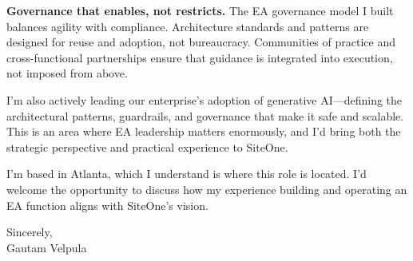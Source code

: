\documentclass[11pt]{article}
\begin{document}
\textbf{Governance that enables, not restricts.} The EA governance model I built balances agility with compliance. Architecture standards and patterns are designed for reuse and adoption, not bureaucracy. Communities of practice and cross-functional partnerships ensure that guidance is integrated into execution, not imposed from above.

I'm also actively leading our enterprise's adoption of generative AI---defining the architectural patterns, guardrails, and governance that make it safe and scalable. This is an area where EA leadership matters enormously, and I'd bring both the strategic perspective and practical experience to SiteOne.

I'm based in Atlanta, which I understand is where this role is located. I'd welcome the opportunity to discuss how my experience building and operating an EA function aligns with SiteOne's vision.

\vspace{16pt}

Sincerely, \\
Gautam Velpula
\end{document}
